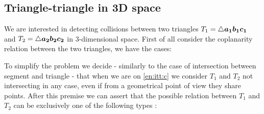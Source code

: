\documentclass[dissertation.tex]{subfiles}
\begin{document}
\subsection{Triangle-triangle in 3D space}\label{sec:intersectionsTriangleTriangle}
We are interested in detecting collisions between two triangles
$T_1=\triangle \boldsymbol{a_1}\boldsymbol{b_1}\boldsymbol{c_1}$ and $T_2=\triangle\boldsymbol{a_2}\boldsymbol{b_2}\boldsymbol{c_2}$ in 3-dimensional
space. First of all consider the coplanarity relation between the two
triangles, we have the cases:
To simplify the problem we decide - similarly to the case of
intersection between segment and triangle - that when we are on \cref{en:itt:c}
we consider $T_1$ and $T_2$ not intersecting in any case, even if from a
geometrical point of view they share points. After this premise we can
assert that the possible relation between $T_1$ and $T_2$ can be
exclusively one
of the following types \cite{schneider}:
\end{document}
